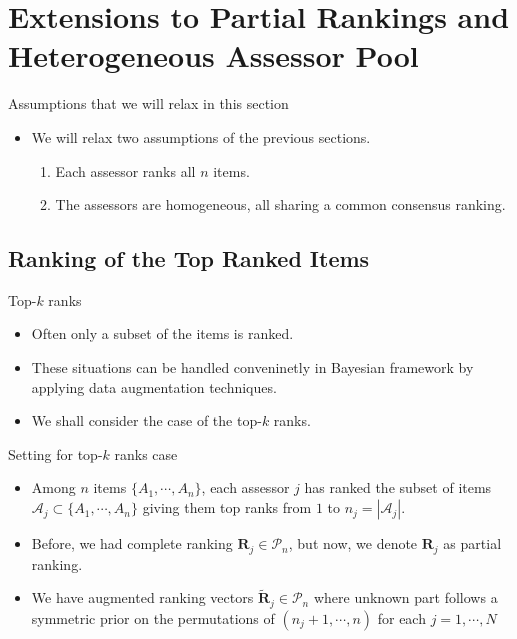 \documentclass[11pt]{beamer}
\begin{document}
\section{Extensions to Partial Rankings and Heterogeneous Assessor Pool}
\begin{frame}{Assumptions that we will relax in this section}
\begin{itemize}
    \item We will relax two assumptions of the previous sections.
    \begin{enumerate}
        \item Each assessor ranks all $n$ items. 
        \item The assessors are homogeneous, all sharing a common consensus ranking.
    \end{enumerate}
\end{itemize}
\end{frame}

\subsection{Ranking of the Top Ranked Items}
\begin{frame}{Top-$k$ ranks}
\begin{itemize}
    \item Often only a subset of the items is ranked.
    \item These situations can be handled conveninetly in Bayesian framework by applying data augmentation techniques.
    \item We shall consider the case of the top-$k$ ranks.
\end{itemize}
\end{frame}

\begin{frame}{Setting for top-$k$ ranks case}
\begin{itemize}
    \item Among $n$ items $\{A_1, \cdots, A_n\}$, each assessor $j$ has ranked the subset of items $\mathcal{A}_j\subset\{A_1, \cdots, A_n\}$ giving them top ranks from $1$ to $n_j=|\mathcal{A}_j|$. 
    \item Before, we had complete ranking $\mathbf{R}_j\in \mathcal{P}_n$, but now, we denote $\mathbf{R}_j$ as partial ranking.
    \item We have augmented ranking vectors $\tilde{\mathbf{R}}_j\in \mathcal{P}_n$ where unknown part follows a symmetric prior on the permutations of $(n_j+1, \cdots, n)$ for each $j=1, \cdots, N$
\end{itemize}
\end{frame}
\end{document}

